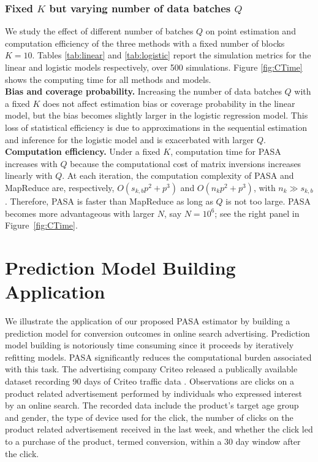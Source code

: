 \documentclass[12pt]{article}
\begin{document}
\subsubsection{Fixed $K$ but varying number of data batches $Q$}
\label{subsubsec:simulations:evaluation:S2}
We study the effect of different number of batches $Q$ on point estimation and computation efficiency of the three methods with a fixed number of blocks $K=10$. Tables \ref{tab:linear} and \ref{tab:logistic} report the simulation metrics for the linear and logistic models respectively, over 500 simulations. Figure \ref{fig:CTime} shows the computing time for all methods and models. \\
\textbf{Bias and coverage probability.} Increasing the number of data batches $Q$ with a fixed $K$ does not affect estimation bias or coverage probability in the linear model, but the bias becomes slightly larger in the logistic regression model. This loss of statistical efficiency is due to approximations in the sequential estimation and inference for the logistic model and is exacerbated with larger $Q$.\\
\textbf{Computation efficiency.} Under a fixed $K$, computation time for PASA increases with $Q$ because the computational cost of matrix inversions increases linearly with $Q$. At each iteration, the computation complexity of PASA and MapReduce are, respectively, $O(s_{k,b}p^2+p^3)$ and $O(n_kp^2+p^3)$, with $n_k \gg s_{k,b}$. Therefore, PASA is faster than MapReduce as long as $Q$ is not too large. PASA becomes more advantageous with larger $N$, say $N=10^6$; see the right panel in Figure~\ref{fig:CTime}.  

\section{Prediction Model Building Application}
\label{sec:application}

We illustrate the application of our proposed PASA estimator by building a prediction model for conversion outcomes in online search advertising. Prediction model building is notoriously time consuming since it proceeds by iteratively refitting models. PASA significantly reduces the computational burden associated with this task. The advertising company Criteo released a publically available dataset recording 90 days of Criteo traffic data \cite{Tallis-etal}. Observations are clicks on a product related advertisement performed by individuals who expressed interest by an online search. The recorded data include the product's target age group and gender, the type of device used for the click, the number of clicks on the product related advertisement received in the last week, and whether the click led to a purchase of the product, termed conversion, within a 30 day window after the click. 
\end{document}
